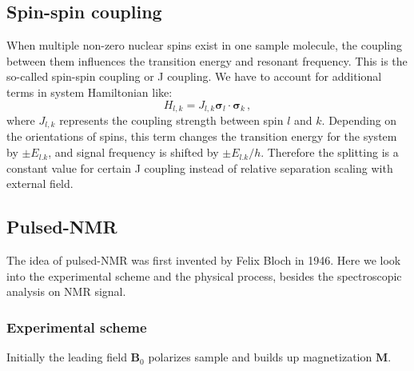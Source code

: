 \subsection{Spin-spin coupling}

When multiple non-zero nuclear spins exist in one sample molecule, the coupling between them influences the transition energy and resonant frequency. This is the so-called spin-spin coupling or J coupling. We have to account for additional terms in system Hamiltonian like:
\begin{equation}
    H_{l,k}  = J_{l,k} \mathbf{\sigma}_l \cdot \mathbf{\sigma}_k\,,
\end{equation}
where $J_{l,k}$ represents the coupling strength between spin $l$ and $k$. Depending on the orientations of spins, this term changes the transition energy for the system by $\pm E_{l.k}$, and signal frequency is shifted by $\pm E_{l.k}/h$. Therefore the splitting is a constant value for certain J coupling instead of relative separation scaling with external field. 

\subsection{Pulsed-NMR}\label{sec:intro:NMR:Pulsed-NMR}


The idea of pulsed-NMR was first invented by Felix Bloch in 1946\cite{Bloch_NuclearInduction_PhysRev.70.460}. Here we look into the experimental scheme and the physical process, besides the spectroscopic analysis on NMR signal. 

\subsubsection{Experimental scheme}
Initially the leading field $\mathbf{B}_0$ polarizes sample and builds up magnetization $\mathbf{M}$. 


